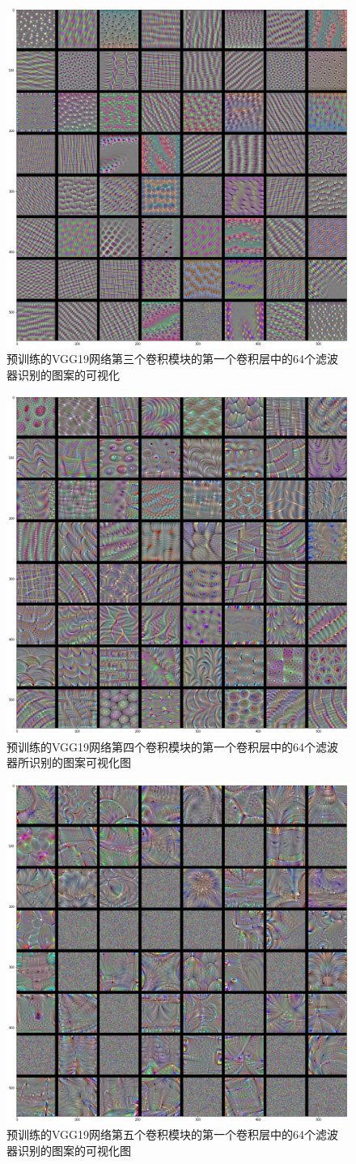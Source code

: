 \documentclass[lang=cn,11pt]{elegantpaper}
\begin{document}
\begin{figure}
	\centering
	\includegraphics[width=0.6\linewidth]
	{block3_conv1}
	\caption{预训练的VGG19网络第三个卷积模块的第一个卷积层中的64个滤波器识别的图案的可视化\label{fig:filter3}}
\end{figure}
\begin{figure}
	\centering
  \includegraphics[width=0.6\linewidth]{block4_conv1}
  \caption{预训练的VGG19网络第四个卷积模块的第一个卷积层中的64个滤波器所识别的图案可视化图\label{fig:filter4}}
\end{figure}
\begin{figure}
\centering
  \includegraphics[width=0.6\linewidth]{block5_conv1.png}
  \caption{预训练的VGG19网络第五个卷积模块的第一个卷积层中的64个滤波器识别的图案的可视化图\label{fig:filter5}}
\end{figure}
\end{document}
